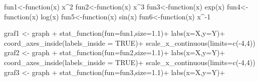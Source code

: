 \documentclass[
  letterpaper,
  DIV=11,
  numbers=noendperiod]{scrartcl}
\newenvironment{Shaded}{\begin{snugshade}}{\end{snugshade}}
\newcommand{\AttributeTok}[1]{\textcolor[rgb]{0.40,0.45,0.13}{#1}}
\newcommand{\ConstantTok}[1]{\textcolor[rgb]{0.56,0.35,0.01}{#1}}
\newcommand{\ControlFlowTok}[1]{\textcolor[rgb]{0.00,0.23,0.31}{#1}}
\newcommand{\DecValTok}[1]{\textcolor[rgb]{0.68,0.00,0.00}{#1}}
\newcommand{\FloatTok}[1]{\textcolor[rgb]{0.68,0.00,0.00}{#1}}
\newcommand{\FunctionTok}[1]{\textcolor[rgb]{0.28,0.35,0.67}{#1}}
\newcommand{\NormalTok}[1]{\textcolor[rgb]{0.00,0.23,0.31}{#1}}
\newcommand{\OtherTok}[1]{\textcolor[rgb]{0.00,0.23,0.31}{#1}}
\newcommand{\SpecialCharTok}[1]{\textcolor[rgb]{0.37,0.37,0.37}{#1}}
\newcommand{\StringTok}[1]{\textcolor[rgb]{0.13,0.47,0.30}{#1}}
\begin{document}
\begin{Shaded}
\begin{Highlighting}[]
\NormalTok{fun1}\OtherTok{\textless{}{-}}\ControlFlowTok{function}\NormalTok{(x) x}\SpecialCharTok{\^{}}\DecValTok{2}
\NormalTok{fun2}\OtherTok{\textless{}{-}}\ControlFlowTok{function}\NormalTok{(x) x}\SpecialCharTok{\^{}}\DecValTok{3}
\NormalTok{fun3}\OtherTok{\textless{}{-}}\ControlFlowTok{function}\NormalTok{(x) }\FunctionTok{exp}\NormalTok{(x)}
\NormalTok{fun4}\OtherTok{\textless{}{-}}\ControlFlowTok{function}\NormalTok{(x) }\FunctionTok{log}\NormalTok{(x)}
\NormalTok{fun5}\OtherTok{\textless{}{-}}\ControlFlowTok{function}\NormalTok{(x) }\FunctionTok{sin}\NormalTok{(x)}
\NormalTok{fun6}\OtherTok{\textless{}{-}}\ControlFlowTok{function}\NormalTok{(x) x}\SpecialCharTok{\^{}{-}}\DecValTok{1}

                          
\NormalTok{graf1 }\OtherTok{\textless{}{-}}\NormalTok{ graph }\SpecialCharTok{+}
  \FunctionTok{stat\_function}\NormalTok{(}\AttributeTok{fun=}\NormalTok{fun1,}\AttributeTok{size=}\FloatTok{1.1}\NormalTok{)}\SpecialCharTok{+}
  \FunctionTok{labs}\NormalTok{(}\AttributeTok{x=}\StringTok{\textquotesingle{}X\textquotesingle{}}\NormalTok{,}\AttributeTok{y=}\StringTok{\textquotesingle{}Y\textquotesingle{}}\NormalTok{)}\SpecialCharTok{+}
  \FunctionTok{coord\_axes\_inside}\NormalTok{(}\AttributeTok{labels\_inside =} \ConstantTok{TRUE}\NormalTok{)}\SpecialCharTok{+}
  \FunctionTok{scale\_x\_continuous}\NormalTok{(}\AttributeTok{limits=}\FunctionTok{c}\NormalTok{(}\SpecialCharTok{{-}}\DecValTok{4}\NormalTok{,}\DecValTok{4}\NormalTok{))}
\NormalTok{graf2 }\OtherTok{\textless{}{-}}\NormalTok{ graph }\SpecialCharTok{+}
  \FunctionTok{stat\_function}\NormalTok{(}\AttributeTok{fun=}\NormalTok{fun2,}\AttributeTok{size=}\FloatTok{1.1}\NormalTok{)}\SpecialCharTok{+}
  \FunctionTok{labs}\NormalTok{(}\AttributeTok{x=}\StringTok{\textquotesingle{}X\textquotesingle{}}\NormalTok{,}\AttributeTok{y=}\StringTok{\textquotesingle{}Y\textquotesingle{}}\NormalTok{)}\SpecialCharTok{+}
  \FunctionTok{coord\_axes\_inside}\NormalTok{(}\AttributeTok{labels\_inside =} \ConstantTok{TRUE}\NormalTok{)}\SpecialCharTok{+}
  \FunctionTok{scale\_x\_continuous}\NormalTok{(}\AttributeTok{limits=}\FunctionTok{c}\NormalTok{(}\SpecialCharTok{{-}}\DecValTok{4}\NormalTok{,}\DecValTok{4}\NormalTok{))}
\NormalTok{graf3 }\OtherTok{\textless{}{-}}\NormalTok{ graph }\SpecialCharTok{+}
  \FunctionTok{stat\_function}\NormalTok{(}\AttributeTok{fun=}\NormalTok{fun3,}\AttributeTok{size=}\FloatTok{1.1}\NormalTok{)}\SpecialCharTok{+}
  \FunctionTok{labs}\NormalTok{(}\AttributeTok{x=}\StringTok{\textquotesingle{}X\textquotesingle{}}\NormalTok{,}\AttributeTok{y=}\StringTok{\textquotesingle{}Y\textquotesingle{}}\NormalTok{)}\SpecialCharTok{+}

\end{Highlighting}
\end{Shaded}
\end{document}
